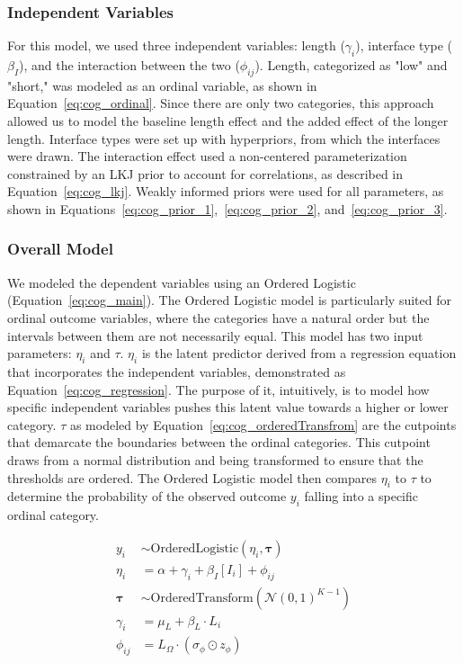 \subsubsection{Independent Variables}
For this model, we used three independent variables: length ($\gamma_i$), interface type ($\beta_I$), and the interaction between the two ($\phi_{ij}$). Length, categorized as "low" and "short," was modeled as an ordinal variable, as shown in Equation~\ref{eq:cog_ordinal}. Since there are only two categories, this approach allowed us to model the baseline length effect and the added effect of the longer length. Interface types were set up with hyperpriors, from which the interfaces were drawn. The interaction effect used a non-centered parameterization constrained by an LKJ prior to account for correlations, as described in Equation~\ref{eq:cog_lkj}. Weakly informed priors were used for all parameters, as shown in Equations~\ref{eq:cog_prior_1},~\ref{eq:cog_prior_2}, and~\ref{eq:cog_prior_3}.

\subsubsection{Overall Model}
We modeled the dependent variables using an Ordered Logistic (Equation~\ref{eq:cog_main}). The Ordered Logistic model is particularly suited for ordinal outcome variables, where the categories have a natural order but the intervals between them are not necessarily equal. This model has two input parameters: $\eta_i$ and $\tau$. $\eta_i$ is the latent predictor derived from a regression equation that incorporates the independent variables, demonstrated as Equation~\ref{eq:cog_regression}. The purpose of it, intuitively, is to model how specific independent variables pushes this latent value towards a higher or lower category. $\tau$ as modeled by Equation~\ref{eq:cog_orderedTransfrom} are the cutpoints that demarcate the boundaries between the ordinal categories. This cutpoint draws from a normal distribution and being transformed to ensure that the thresholds are ordered. The Ordered Logistic model then compares $\eta_i$ to $\tau$ to determine the probability of the observed outcome $y_i$ falling into a specific ordinal category.


\begin{align}
    y_i &\sim \text{OrderedLogistic}(\eta_i, \boldsymbol{\tau}) \label{eq:cog_main}\\
    \eta_i &= \alpha + \gamma_i + \beta_I[I_i] + \phi_{ij} \label{eq:cog_regression}\\
    \boldsymbol{\tau} &\sim \text{OrderedTransform}(\mathcal{N}(0, 1)^{K-1}) \label{eq:cog_orderedTransfrom} \\
    \gamma_i &= \mu_L + \beta_L \cdot L_i \label{eq:cog_ordinal} \\
    \phi_{ij} &= L_{\Omega} \cdot (\sigma_{\phi} \odot z_{\phi}) \label{eq:cog_lkj}
\end{align}


